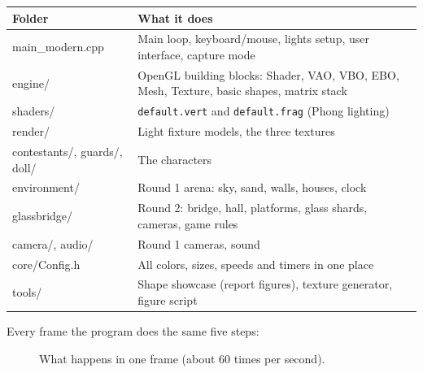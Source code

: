 \documentclass[11pt,a4paper]{article}
\begin{document}
\begin{table}[H]
\centering\small
{}
\begin{tabularx}{\linewidth}{>{\ttfamily}p{3.5cm} L}
\toprule
{}\normalfont\textbf{Folder} & \textbf{What it does} \\ \midrule
main\_modern.cpp & Main loop, keyboard/mouse, lights setup, user interface, capture mode \\
engine/ & OpenGL building blocks: Shader, VAO, VBO, EBO, Mesh, Texture, basic shapes, matrix stack \\
shaders/ & \texttt{default.vert} and \texttt{default.frag} (Phong lighting) \\
render/ & Light fixture models, the three textures \\
contestants/, guards/, doll/ & The characters \\
environment/ & Round 1 arena: sky, sand, walls, houses, clock \\
glassbridge/ & Round 2: bridge, hall, platforms, glass shards, cameras, game rules \\
camera/, audio/ & Round 1 cameras, sound \\
core/Config.h & All colors, sizes, speeds and timers in one place \\
tools/ & Shape showcase (report figures), texture generator, figure script \\
\bottomrule
\end{tabularx}
\end{table}

Every frame the program does the same five steps:

\begin{figure}[H]
\centering
{}
\caption{What happens in one frame (about 60 times per second).}
\end{figure}
\end{document}
